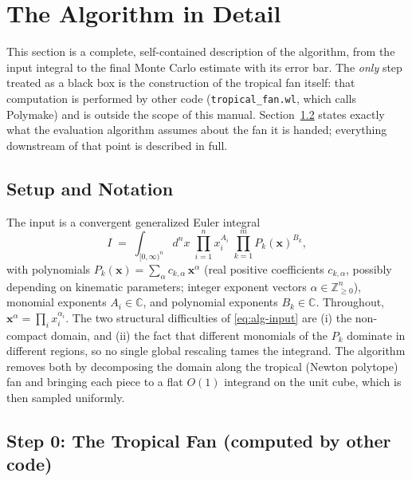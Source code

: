 \documentclass[11pt,a4paper]{article}
\begin{document}
\section{The Algorithm in Detail}\label{sec:algorithm}

This section is a complete, self-contained description of the algorithm, from
the input integral to the final Monte Carlo estimate with its error bar. The
\emph{only} step treated as a black box is the construction of the tropical
fan itself: that computation is performed by other code
(\texttt{tropical\_fan.wl}, which calls Polymake) and is outside the scope of
this manual. Section~\ref{sec:fanblackbox} states exactly what the evaluation
algorithm assumes about the fan it is handed; everything downstream of that
point is described in full.

\subsection{Setup and Notation}

The input is a convergent generalized Euler integral
\begin{equation}\label{eq:alg-input}
I \;=\; \int_{[0,\infty)^n} d^n x \;\prod_{i=1}^{n} x_i^{A_i}
        \;\prod_{k=1}^{m} P_k(\mathbf{x})^{B_k},
\end{equation}
with polynomials $P_k(\mathbf{x}) = \sum_{\alpha} c_{k,\alpha}\,\mathbf{x}^\alpha$
(real positive coefficients $c_{k,\alpha}$, possibly depending on kinematic
parameters; integer exponent vectors $\alpha \in \mathbb{Z}_{\geq 0}^n$),
monomial exponents $A_i \in \mathbb{C}$, and polynomial exponents
$B_k \in \mathbb{C}$. Throughout, $\mathbf{x}^\alpha = \prod_i x_i^{\alpha_i}$.
The two structural difficulties of \eqref{eq:alg-input} are (i) the
non-compact domain, and (ii) the fact that different monomials of the $P_k$
dominate in different regions, so no single global rescaling tames the
integrand. The algorithm removes both by decomposing the domain along the
tropical (Newton polytope) fan and bringing each piece to a flat $O(1)$
integrand on the unit cube, which is then sampled uniformly.

\subsection{Step 0: The Tropical Fan (computed by other code)}\label{sec:fanblackbox}
\end{document}
